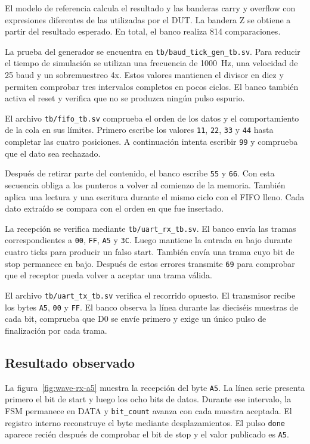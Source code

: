El modelo de referencia calcula el resultado y las banderas carry y
overflow con expresiones diferentes de las utilizadas por el DUT. La
bandera Z se obtiene a partir del resultado esperado. En total, el
banco realiza 814 comparaciones.

La prueba del generador se encuentra en
\texttt{tb/baud\_tick\_gen\_tb.sv}. Para reducir el tiempo de
simulación se utilizan una frecuencia de \SI{1000}{\hertz}, una
velocidad de \num{25} baud y un sobremuestreo 4x. Estos valores
mantienen el divisor en diez y permiten comprobar tres intervalos
completos en pocos ciclos. El banco también activa el reset y
verifica que no se produzca ningún pulso espurio.

El archivo \texttt{tb/fifo\_tb.sv} comprueba el orden de los datos y
el comportamiento de la cola en sus límites. Primero escribe los
valores \texttt{11}, \texttt{22}, \texttt{33} y \texttt{44} hasta
completar las cuatro posiciones. A continuación intenta escribir
\texttt{99} y comprueba que el dato sea rechazado.

Después de retirar parte del contenido, el banco escribe \texttt{55}
y \texttt{66}. Con esta secuencia obliga a los punteros a volver al
comienzo de la memoria. También aplica una lectura y una escritura
durante el mismo ciclo con el FIFO lleno. Cada dato extraído se
compara con el orden en que fue insertado.

La recepción se verifica mediante
\texttt{tb/uart\allowbreak\_rx\allowbreak\_tb.sv}. El banco envía las
tramas correspondientes a \texttt{00}, \texttt{FF}, \texttt{A5} y
\texttt{3C}. Luego mantiene la entrada en bajo durante cuatro ticks
para producir un falso start. También envía una trama cuyo bit de
stop permanece en bajo. Después de estos errores transmite
\texttt{69} para comprobar que el receptor pueda volver a aceptar una
trama válida.

El archivo \texttt{tb/uart\_tx\_tb.sv} verifica el recorrido opuesto.
El transmisor recibe los bytes \texttt{A5}, \texttt{00} y
\texttt{FF}. El banco observa la línea durante las dieciséis muestras
de cada bit, comprueba que D0 se envíe primero y exige un único pulso
de finalización por cada trama.

\subsection{Resultado observado}

La figura~\ref{fig:wave-rx-a5} muestra la recepción del byte
\texttt{A5}. La línea serie presenta primero el bit de start y luego
los ocho bits de datos. Durante ese intervalo, la FSM permanece en
DATA y \texttt{bit\_count} avanza con cada muestra aceptada. El
registro interno reconstruye el byte mediante desplazamientos. El
pulso \texttt{done} aparece recién después de comprobar el bit de
stop y el valor publicado es \texttt{A5}.

